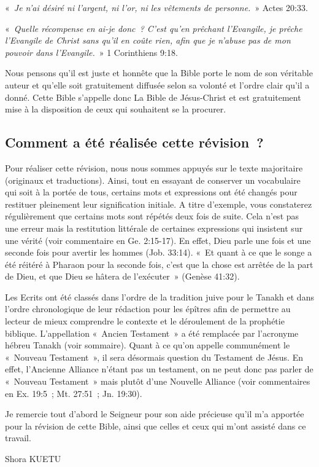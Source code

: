 \begin{small}
«~\emph{Je n'ai désiré ni l'argent, ni l'or, ni les vêtements de personne.}~» Actes 20:33.\bigskip

«~\emph{Quelle récompense en ai-je donc~? C’est qu’en prêchant l’Evangile, je prêche l’Evangile de Christ sans qu’il en coûte rien, afin que je n’abuse pas de mon pouvoir dans l’Evangile.}~» 1 Corinthiens 9:18.\bigskip

Nous pensons qu'il est juste et honnête que la Bible porte le nom de son véritable auteur et qu'elle soit gratuitement diffusée selon sa volonté et l'ordre clair qu'il a donné. Cette Bible s'appelle donc La Bible de Jésus-Christ et est gratuitement mise à la disposition de ceux qui souhaitent se la procurer.\bigskip

\subsection*{Comment a été réalisée cette révision~?}

Pour réaliser cette révision, nous nous sommes appuyés sur le texte majoritaire (originaux et traductions). Ainsi, tout en essayant de conserver un vocabulaire qui soit à la portée de tous, certains mots et expressions ont été changés pour restituer pleinement leur signification initiale. A titre d'exemple, vous constaterez régulièrement que certains mots sont répétés deux fois de suite. Cela n'est pas une erreur mais la restitution littérale de certaines expressions qui insistent sur une vérité (voir commentaire en Ge. 2:15-17). En effet, Dieu parle une fois et une seconde fois pour avertir les hommes (Job. 33:14). «~Et quant à ce que le songe a été réitéré à Pharaon pour la seconde fois, c'est que la chose est arrêtée de la part de Dieu, et que Dieu se hâtera de l'exécuter~» (Genèse 41:32).\bigskip

Les Ecrits ont été classés dans l'ordre de la tradition juive pour le Tanakh et dans l'ordre chronologique de leur rédaction pour les épîtres afin de permettre au lecteur de mieux comprendre le contexte et le déroulement de la prophétie biblique. L'appellation «~Ancien Testament~» a été remplacée par l'acronyme hébreu Tanakh (voir sommaire). Quant à ce qu'on appelle communément le «~Nouveau Testament~», il sera désormais question du Testament de Jésus. En effet, l'Ancienne Alliance n'étant pas un testament, on ne peut donc pas parler de «~Nouveau Testament~» mais plutôt d'une Nouvelle Alliance (voir commentaires en Ex. 19:5~; Mt. 27:51~; Jn. 19:30).\bigskip

Je remercie tout d'abord le Seigneur pour son aide précieuse qu'il m'a apportée pour la révision de cette Bible, ainsi que celles et ceux qui m’ont assisté dans ce travail.\newline

\begin{flushright}
Shora KUETU
\end{flushright}
\end{small}
